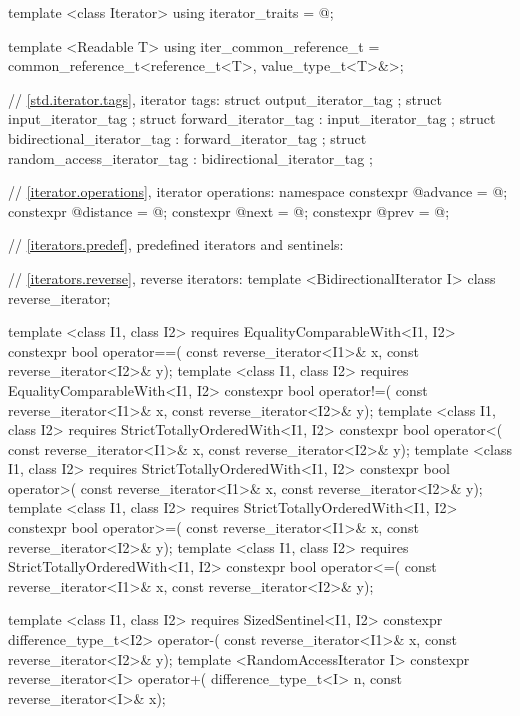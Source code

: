 \begin{codeblock}
{{{{  template <class Iterator> using iterator_traits = @\seebelow@;

  template <Readable T> using iter_common_reference_t
    = common_reference_t<reference_t<T>, value_type_t<T>&>;

  // \ref{std.iterator.tags}, iterator tags:
  struct output_iterator_tag { };
  struct input_iterator_tag { };
  struct forward_iterator_tag : input_iterator_tag { };
  struct bidirectional_iterator_tag : forward_iterator_tag { };
  struct random_access_iterator_tag : bidirectional_iterator_tag { };

  // \ref{iterator.operations}, iterator operations:
  namespace {
    constexpr @\unspec@ advance = @\unspec@;
    constexpr @\unspec@ distance = @\unspec@;
    constexpr @\unspec@ next = @\unspec@;
    constexpr @\unspec@ prev = @\unspec@;
  }

  // \ref{iterators.predef}, predefined iterators and sentinels:

  // \ref{iterators.reverse}, reverse iterators:
  template <BidirectionalIterator I> class reverse_iterator;

  template <class I1, class I2>
      requires EqualityComparableWith<I1, I2>
    constexpr bool operator==(
      const reverse_iterator<I1>& x,
      const reverse_iterator<I2>& y);
  template <class I1, class I2>
      requires EqualityComparableWith<I1, I2>
    constexpr bool operator!=(
      const reverse_iterator<I1>& x,
      const reverse_iterator<I2>& y);
  template <class I1, class I2>
      requires StrictTotallyOrderedWith<I1, I2>
    constexpr bool operator<(
      const reverse_iterator<I1>& x,
      const reverse_iterator<I2>& y);
  template <class I1, class I2>
      requires StrictTotallyOrderedWith<I1, I2>
    constexpr bool operator>(
      const reverse_iterator<I1>& x,
      const reverse_iterator<I2>& y);
  template <class I1, class I2>
      requires StrictTotallyOrderedWith<I1, I2>
    constexpr bool operator>=(
      const reverse_iterator<I1>& x,
      const reverse_iterator<I2>& y);
  template <class I1, class I2>
      requires StrictTotallyOrderedWith<I1, I2>
    constexpr bool operator<=(
      const reverse_iterator<I1>& x,
      const reverse_iterator<I2>& y);

  template <class I1, class I2>
      requires SizedSentinel<I1, I2>
    constexpr difference_type_t<I2> operator-(
      const reverse_iterator<I1>& x,
      const reverse_iterator<I2>& y);
  template <RandomAccessIterator I>
    constexpr reverse_iterator<I> operator+(
      difference_type_t<I> n,
      const reverse_iterator<I>& x);

}}}}
\end{codeblock}
